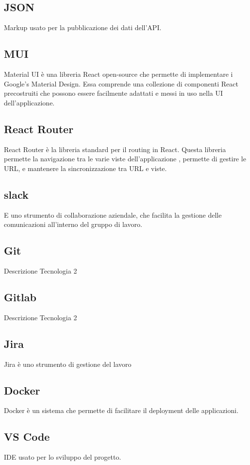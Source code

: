 \subsection*{JSON}
Markup usato per la pubblicazione dei dati dell’API.

\subsection*{MUI}
Material UI è una libreria React open-source che permette di implementare i Google's Material Design. Essa comprende una collezione di componenti React precostruiti che possono essere facilmente adattati e messi in uso nella UI dell'applicazione. 

\subsection*{React Router}
React Router è la libreria standard per il routing in React. Questa libreria permette la navigazione tra le varie viste dell'applicazione , permette di gestire le URL, e mantenere la sincronizzazione tra URL e viste.

\subsection*{slack}
E uno strumento di collaborazione aziendale, che facilita la gestione delle comunicazioni all'interno del gruppo di lavoro.

\subsection*{Git}
Descrizione Tecnologia 2

\subsection*{Gitlab}
Descrizione Tecnologia 2

\subsection*{Jira}
Jira è uno strumento di gestione del lavoro

\subsection*{Docker}
Docker è un sistema che permette di facilitare il deployment delle applicazioni. 

\subsection*{VS Code}
IDE usato per lo sviluppo del progetto.

